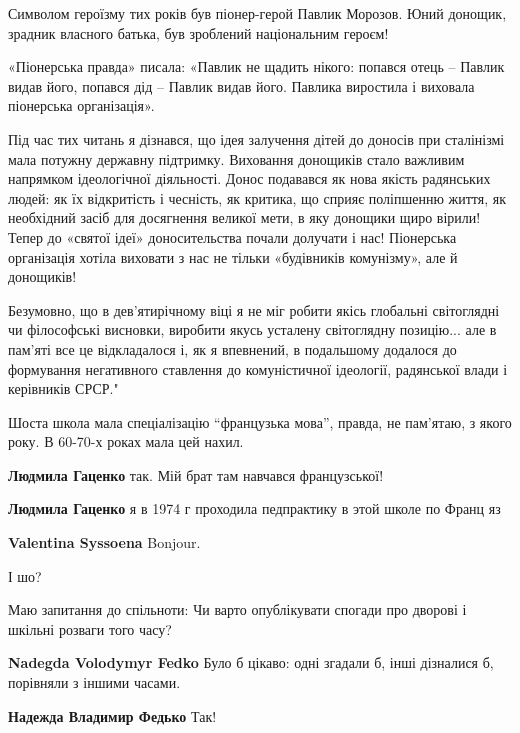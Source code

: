 \begin{itemize}
Символом героїзму тих років був піонер-герой Павлик Морозов. Юний донощик,
зрадник власного батька, був зроблений національним героєм!

«Піонерська правда» писала: «Павлик не щадить нікого: попався отець – Павлик
видав його, попався дід – Павлик видав його. Павлика виростила і виховала
піонерська організація».

Під час тих читань я дізнався, що ідея залучення дітей до доносів при
сталінізмі мала потужну державну підтримку. Виховання донощиків стало важливим
напрямком ідеологічної діяльності. Донос подавався як нова якість радянських
людей: як їх відкритість і чесність, як критика, що сприяє поліпшенню життя, як
необхідний засіб для досягнення великої мети, в яку донощики щиро вірили! Тепер
до «святої ідеї» доносительства почали долучати і нас! Піонерська організація
хотіла виховати з нас не тільки «будівників комунізму», але й донощиків!

Безумовно, що в дев’ятирічному віці я не міг робити якісь глобальні світоглядні
чи філософські висновки, виробити якусь усталену світоглядну позицію... але в
пам’яті все це відкладалося і, як я впевнений, в подальшому додалося до
формування негативного ставлення до комуністичної ідеології, радянської влади і
керівників СРСР."



Шоста школа мала спеціалізацію \enquote{французька мова}, правда, не пам'ятаю,
з якого року. В 60-70-х роках мала цей нахил.

\begin{itemize} %
\textbf{Людмила Гаценко} так. Мій брат там навчався французської!

\textbf{Людмила Гаценко} я в 1974 г проходила педпрактику в этой школе по Франц яз

\textbf{Valentina Syssoena}
Bonjour.
\end{itemize} %

І шо?


Маю запитання до спільноти: Чи варто опублікувати спогади про дворові і шкільні
розваги того часу?

\begin{itemize} %
\textbf{Nadegda Volodymyr Fedko}
Було б цікаво: одні згадали б, інші дізналися б, порівняли з іншими часами.

\textbf{Надежда Владимир Федько} Так!


\end{itemize}
\end{itemize}
